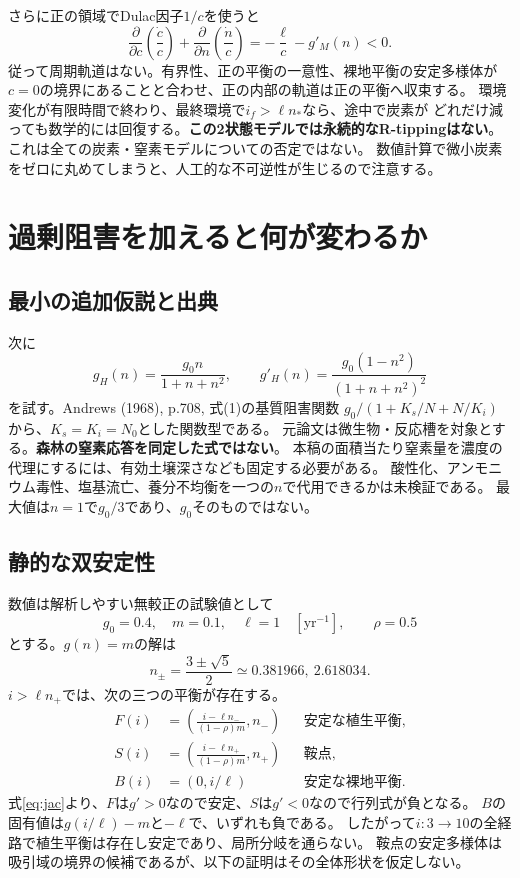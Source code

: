 \documentclass[a4paper,11pt]{ltjsarticle}
\begin{document}
さらに正の領域でDulac因子$1/c$を使うと
\begin{equation}
\frac{\partial}{\partial c}\left(\frac{\dot c}{c}\right)
+\frac{\partial}{\partial n}\left(\frac{\dot n}{c}\right)
=-\frac\ell c-g'_M(n)<0.
\end{equation}
従って周期軌道はない。有界性、正の平衡の一意性、裸地平衡の安定多様体が
$c=0$の境界にあることと合わせ、正の内部の軌道は正の平衡へ収束する。
環境変化が有限時間で終わり、最終環境で$i_f>\ell n_*$なら、途中で炭素が
どれだけ減っても数学的には回復する。\textbf{この2状態モデルでは永続的なR-tippingはない}。
これは全ての炭素・窒素モデルについての否定ではない。
数値計算で微小炭素をゼロに丸めてしまうと、人工的な不可逆性が生じるので注意する。

\section{過剰阻害を加えると何が変わるか}
\subsection{最小の追加仮説と出典}
次に
\begin{equation}
g_H(n)=\frac{g_0 n}{1+n+n^2},\qquad
g'_H(n)=\frac{g_0(1-n^2)}{(1+n+n^2)^2}
\label{eq:haldane}
\end{equation}
を試す。Andrews (1968), p.708, 式(1)の基質阻害関数
$g_0/(1+K_s/N+N/K_i)$から、$K_s=K_i=N_0$とした関数型である\cite{andrews}。
元論文は微生物・反応槽を対象とする。\textbf{森林の窒素応答を同定した式ではない}。
本稿の面積当たり窒素量を濃度の代理にするには、有効土壌深さなども固定する必要がある。
酸性化、アンモニウム毒性、塩基流亡、養分不均衡を一つの$n$で代用できるかは未検証である。
最大値は$n=1$で$g_0/3$であり、$g_0$そのものではない。

\subsection{静的な双安定性}
数値は解析しやすい無較正の試験値として
\begin{equation}
g_0=0.4,\quad m=0.1,\quad\ell=1\quad[\mathrm{yr^{-1}}],
\qquad\rho=0.5
\label{eq:parameters}
\end{equation}
とする。$g(n)=m$の解は
\begin{equation}n_\pm=\frac{3\pm\sqrt5}{2}
\simeq 0.381966,\ 2.618034.\end{equation}
$i>\ell n_+$では、次の三つの平衡が存在する。
\begin{align}
F(i)&=\left(\frac{i-\ell n_-}{(1-\rho)m},n_-\right)
&&\text{安定な植生平衡},\\
S(i)&=\left(\frac{i-\ell n_+}{(1-\rho)m},n_+\right)
&&\text{鞍点},\\
B(i)&=(0,i/\ell)&&\text{安定な裸地平衡}.
\end{align}
式\eqref{eq:jac}より、$F$は$g'>0$なので安定、$S$は$g'<0$なので行列式が負となる。
$B$の固有値は$g(i/\ell)-m$と$-\ell$で、いずれも負である。
したがって$i:3\to10$の全経路で植生平衡は存在し安定であり、局所分岐を通らない。
鞍点の安定多様体は吸引域の境界の候補であるが、以下の証明はその全体形状を仮定しない。
\end{document}

